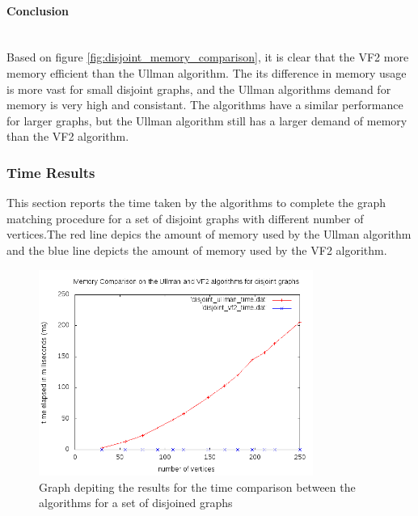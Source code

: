\paragraph{Conclusion}\mbox{}\\
Based on figure \ref{fig:disjoint_memory_comparison}, it is clear that the VF2 more memory efficient than the Ullman algorithm. The its difference in memory 
usage is more vast for small disjoint graphs, and the Ullman algorithms demand for memory is very high and consistant. The algorithms have a similar 
performance for larger graphs, but the Ullman algorithm still has a larger demand of memory than the VF2 algorithm.


\subsubsection{Time Results}
This section reports the time taken by the algorithms to complete the graph matching procedure for a set of disjoint graphs with different number of vertices.The red line depics the amount of memory
 used by the Ullman algorithm and the blue line depicts the amount of memory used by the VF2 algorithm.

\begin{figure}[H]
  \begin{center}
      \includegraphics[width=0.8\textwidth]{disjoint_time.png}
  \end{center}    
  \caption{Graph depiting the results for the time comparison between the algorithms for a set of disjoined graphs}
  \label{fig:disjoint_time_comparison}
\end{figure}


